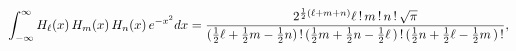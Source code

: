 \[\int_{-\infty}^{\infty}\mathop{H_{\ell}\/}\nolimits\!\left(x\right)\mathop{H_{%
m}\/}\nolimits\!\left(x\right)\mathop{H_{n}\/}\nolimits\!\left(x\right)e^{-x^{%
2}}dx=\frac{2^{\frac{1}{2}(\ell+m+n)}\ell\,!\,m\,!\,n\,!\,\sqrt{\pi}}{(\tfrac{%
1}{2}\ell+\tfrac{1}{2}m-\tfrac{1}{2}n)\,!\,(\tfrac{1}{2}m+\tfrac{1}{2}n-\tfrac%
{1}{2}\ell\,)\,!\,(\tfrac{1}{2}n+\tfrac{1}{2}\ell-\tfrac{1}{2}m\,)\,!},\]